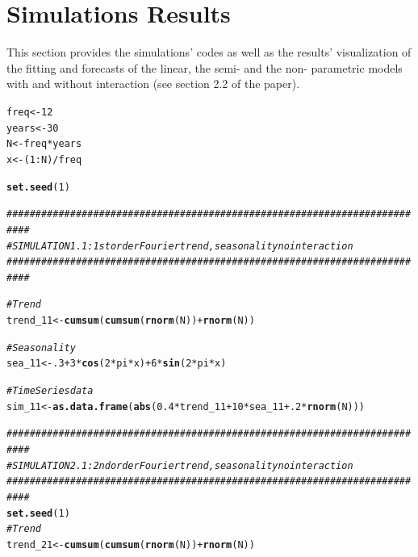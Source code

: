 \documentclass{article}\usepackage[]{graphicx}\usepackage[]{color}
\makeatletter
\newcommand{\hlnum}[1]{\textcolor[rgb]{0.686,0.059,0.569}{#1}}%
\newcommand{\hlcom}[1]{\textcolor[rgb]{0.678,0.584,0.686}{\textit{#1}}}%
\newcommand{\hlopt}[1]{\textcolor[rgb]{0,0,0}{#1}}%
\newcommand{\hlstd}[1]{\textcolor[rgb]{0.345,0.345,0.345}{#1}}%
\newcommand{\hlkwb}[1]{\textcolor[rgb]{0.69,0.353,0.396}{#1}}%
\newcommand{\hlkwd}[1]{\textcolor[rgb]{0.737,0.353,0.396}{\textbf{#1}}}%
\newenvironment{kframe}{%
 \def\at@end@of@kframe{}%
 \ifinner\ifhmode%
  \def\at@end@of@kframe{\end{minipage}}%
  \begin{minipage}{\columnwidth}%
 \fi\fi%
 \def\FrameCommand##1{\hskip\@totalleftmargin \hskip-\fboxsep
 \colorbox{shadecolor}{##1}\hskip-\fboxsep
     \hskip-\linewidth \hskip-\@totalleftmargin \hskip\columnwidth}%
 \MakeFramed {\advance\hsize-\width
   \@totalleftmargin\z@ \linewidth\hsize
   \@setminipage}}%
 {\par\unskip\endMakeFramed%
 \at@end@of@kframe}
\newenvironment{knitrout}{}{} %
\makeatother
\begin{document}
\section{Simulations Results}\label{simumations}

This section provides the simulations' codes as well as the results' visualization of the fitting and forecasts of the linear, the semi- and the non- parametric models with and without interaction (see section 2.2 of the paper).

\begin{knitrout}
\color{fgcolor}\begin{kframe}
\begin{alltt}
\hlstd{freq} \hlkwb{<-} \hlnum{12}
\hlstd{years} \hlkwb{<-} \hlnum{30}
\hlstd{N} \hlkwb{<-} \hlstd{freq}\hlopt{*}\hlstd{years}
\hlstd{x} \hlkwb{<-} \hlstd{(}\hlnum{1}\hlopt{:}\hlstd{N)}\hlopt{/}\hlstd{freq}

\hlkwd{set.seed}\hlstd{(}\hlnum{1}\hlstd{)}

\hlcom{##########################################################################}
\hlcom{# SIMULATION 1.1: 1st order Fourier trend, seasonality no interaction}
\hlcom{##########################################################################}

\hlcom{# Trend}
\hlstd{trend_11} \hlkwb{<-} \hlkwd{cumsum}\hlstd{(}\hlkwd{cumsum}\hlstd{(}\hlkwd{rnorm}\hlstd{(N))}\hlopt{+}\hlkwd{rnorm}\hlstd{(N))}

\hlcom{# Seasonality}
\hlstd{sea_11} \hlkwb{<-} \hlnum{.3} \hlopt{+} \hlnum{3}\hlopt{*}\hlkwd{cos}\hlstd{(}\hlnum{2}\hlopt{*}\hlstd{pi}\hlopt{*}\hlstd{x)} \hlopt{+} \hlnum{6}\hlopt{*}\hlkwd{sin}\hlstd{(}\hlnum{2}\hlopt{*}\hlstd{pi}\hlopt{*}\hlstd{x)}

\hlcom{# Time Series data}
\hlstd{sim_11} \hlkwb{<-} \hlkwd{as.data.frame}\hlstd{(}\hlkwd{abs}\hlstd{(}\hlnum{0.4}\hlopt{*}\hlstd{trend_11} \hlopt{+} \hlnum{10}\hlopt{*}\hlstd{sea_11} \hlopt{+} \hlnum{.2}\hlopt{*}\hlkwd{rnorm}\hlstd{(N)))}

\hlcom{##########################################################################}
\hlcom{# SIMULATION 2.1: 2nd order Fourier trend, seasonality no interaction}
\hlcom{##########################################################################}
\hlkwd{set.seed}\hlstd{(}\hlnum{1}\hlstd{)}
\hlcom{# Trend}
\hlstd{trend_21} \hlkwb{<-} \hlkwd{cumsum}\hlstd{(}\hlkwd{cumsum}\hlstd{(}\hlkwd{rnorm}\hlstd{(N))}\hlopt{+}\hlkwd{rnorm}\hlstd{(N))}


\end{alltt}
\end{kframe}
\end{knitrout}
\end{document}
